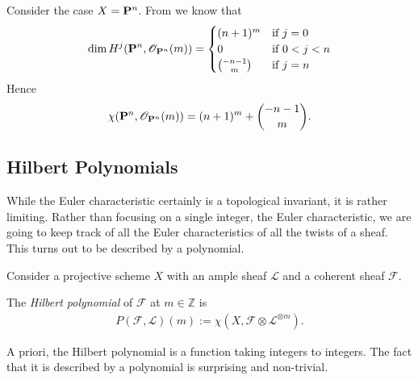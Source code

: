 \documentclass[12pt]{ociamthesis}  %
\begin{document}
\begin{example}
  Consider the case $X=\mathbf{P}^{n}_{}$.
  From \missingcitation we know that
  \begin{align*}
    \dim H^j(\mathbf{P}^{n}_{},\mathscr O_{\mathbf{P}^{n}_{}}(m)) =
    \begin{cases}
      (n+1)^m         & \text{if }j = 0 \\
      0               & \text{if }0<j<n \\
      \binom{-n-1}{m} & \text{if }j=n
    \end{cases}
  \end{align*}
  Hence 
  \begin{align*}
    \chi(\mathbf{P}^{n}_{},\mathscr O_{\mathbf{P}^{n}_{}}(m))
    = (n+1)^m + \binom{-n-1}{m}.
  \end{align*}
\end{example}

\begin{lemma}
\end{lemma}

\begin{lemma}
\end{lemma}

\subsection{Hilbert Polynomials}

While the Euler characteristic certainly is a topological invariant,
it is rather limiting. Rather than focusing on a single integer,
the Euler characteristic,
we are going to keep track of all the Euler characteristics of all
the twists of a sheaf. This turns out to be described by a polynomial.

Consider a projective scheme $X$ with an ample sheaf $\mathscr L$
and a coherent sheaf $\mathscr F$.

\begin{definition}
  The \emph{Hilbert polynomial} of $\mathscr F$ at $m\in\mathbb{Z}$
  is
  \begin{align*}
    P(\mathscr F,\mathscr L)(m) := \chi(X,\mathscr F \otimes \mathscr L^{\otimes m}).
  \end{align*}
\end{definition}

A priori, the Hilbert polynomial is a function taking integers to
integers. The fact that it is described by a polynomial is
surprising and non-trivial.
\end{document}
